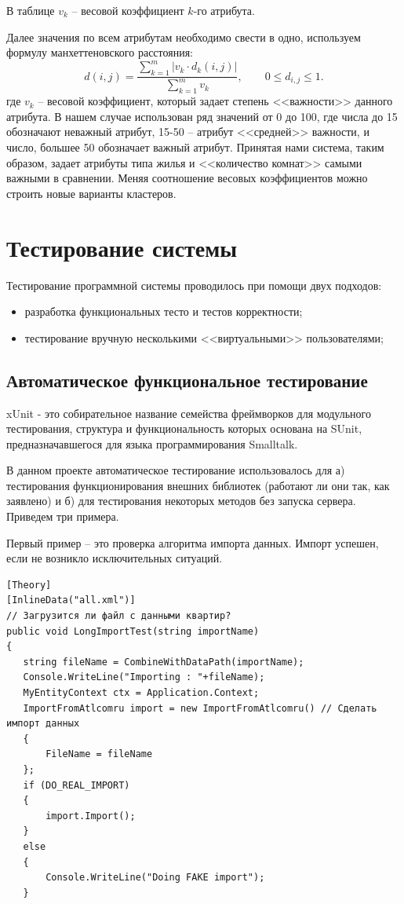 \documentclass[a4paper,14pt,openany,final]{extreport} %
\begin{document}
{\begin{table}[htbp]
  В таблице $v_k$ -- весовой коэффициент $k$-го атрибута.
\end{table}

Далее значения по всем атрибутам необходимо свести в одно, используем формулу манхеттеновского расстояния:
\[
  d(i,j)=\frac{\sum\limits_{k=1}^m|v_k\cdot d_k(i,j)|}{\sum\limits_{k=1}^m v_k}, \qquad 0\leqslant d_{i,j}\leqslant 1.
\]
где $v_k$ -- весовой коэффициент, который задает степень <<важности>> данного атрибута. В нашем случае использован ряд значений от 0 до 100, где числа до 15 обозначают неважный атрибут, 15-50 -- атрибут <<средней>> важности, и число, большее 50 обозначает важный атрибут. Принятая нами система, таким образом, задает атрибуты типа жилья и <<количество комнат>> самыми важными в сравнении. Меняя соотношение весовых коэффициентов можно строить новые варианты кластеров.

\section{Тестирование системы}
Тестирование программной системы проводилось при помощи двух подходов:
\begin{itemize}
\item разработка функциональных тесто и тестов корректности;
\item тестирование вручную несколькими <<виртуальными>> пользователями;
\end{itemize}

\subsection{Автоматическое функциональное тестирование}
xUnit - это собирательное название семейства фреймворков для модульного тестирования, структура и функциональность которых основана на SUnit, предназначавшегося для языка программирования Smalltalk.

В данном проекте автоматическое тестирование использовалось для а) тестирования функционирования внешних библиотек (работают ли они так, как заявлено) и б) для тестирования некоторых методов без запуска сервера. Приведем три примера.

Первый пример -- это проверка алгоритма импорта данных. Импорт успешен, если не возникло исключительных ситуаций.
\begin{verbatim}
[Theory]
[InlineData("all.xml")]
// Загрузится ли файл с данными квартир?
public void LongImportTest(string importName)
{
   string fileName = CombineWithDataPath(importName);
   Console.WriteLine("Importing : "+fileName);
   MyEntityContext ctx = Application.Context;
   ImportFromAtlcomru import = new ImportFromAtlcomru() // Сделать импорт данных
   {
       FileName = fileName
   };
   if (DO_REAL_IMPORT)
   {
       import.Import();
   }
   else
   {
       Console.WriteLine("Doing FAKE import");
   }


\end{verbatim}}
\end{document}
